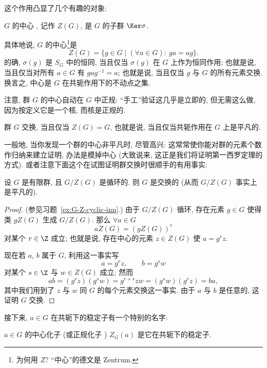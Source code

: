 这个作用凸显了几个有趣的对象:

\begin{definition}
\label{def:center}
$G$ 的中心%
, 记作 $Z(G)$, 是 $G$ 的子群 $\Ker \sigma$.
\end{definition}

具体地说, $G$ 的中心\footnote{为何用 $Z$? ``中心''的德文是 Zentrum.}是
\[
Z(G) = \{g \in G \mid (\forall a \in G):\ ga = ag\}.
\]
的确, $\sigma(g)$ 是 $S_G$ 中的恒同, 当且仅当 $\sigma(g)$ 在 $G$ 上作为恒同作用; 也就是说, 当且仅当对所有 $a \in G$ 有 $gag^{-1} = a$; 也就是说, 当且仅当 $g$ 与 $G$ 的所有元素交换. 换言之, 中心是 $G$ 在共轭作用下的不动点之集.

注意, 群 $G$ 的中心自动在 $G$ 中正规: ``手工''验证这几乎是立即的, 但无需这么做, 因为按定义它是一个核, 而核是正规的.

群 $G$ 交换, 当且仅当 $Z(G) = G$, 也就是说, 当且仅当共轭作用在 $G$ 上是平凡的.

一般地, 当你发现一个群的中心非平凡时, 尽管高兴: 这常常使你能对群的元素个数作归纳来建立证明, 办法是模掉中心 (大致说来, 这正是我们将证明第一西罗定理的方式). 或者注意下面这个在试图证明群交换时很顺手的有用事实:

\begin{lemma}
\label{lem:quotient-center-cyclic}
设 $G$ 是有限群, 且 $G/Z(G)$ 是循环的. 则 $G$ 是交换的 (从而 $G/Z(G)$ 事实上是平凡的).
\end{lemma}

\begin{proof}
(参见习题~\ref{ex:G-Z-cyclic-inn}.) 由于 $G/Z(G)$ 循环, 存在元素 $g \in G$ 使得类 $gZ(G)$ 生成 $G/Z(G)$. 那么 $\forall a \in G$
\[
aZ(G) = (gZ(G))^r
\]
对某个 $r \in \Z$ 成立; 也就是说, 存在中心的元素 $z \in Z(G)$ 使 $a = g^r z$.

现在若 $a$, $b$ 属于 $G$, 利用这一事实写
\[
a = g^r z, \qquad b = g^s w
\]
对某个 $s \in \Z$ 与 $w \in Z(G)$ 成立; 然而
\[
ab = (g^r z)(g^s w) = g^{r+s}zw = (g^s w)(g^r z) = ba,
\]
其中我们用到了 $z$ 与 $w$ 同 $G$ 的每个元素交换这一事实. 由于 $a$ 与 $b$ 是任意的, 这证明 $G$ 交换.
\end{proof}

接下来, $a \in G$ 在共轭下的稳定子有一个特别的名字:

\begin{definition}
\label{def:centralizer}
$a \in G$ 的中心化子%
(或正规化子%
) $Z_G(a)$ 是它在共轭下的稳定子.
\end{definition}

